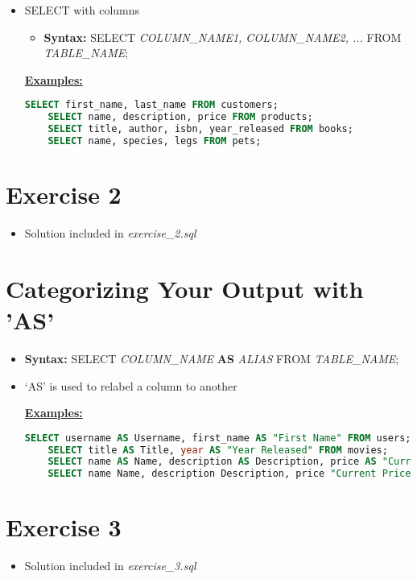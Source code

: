 \documentclass[12pt]{article}
\begin{document}
\bigskip

\begin{itemize}
    \item SELECT with columns
    \begin{itemize}
        \item \textbf{Syntax:} SELECT \textit{COLUMN\_NAME1, COLUMN\_NAME2, ...} FROM \textit{TABLE\_NAME};
    \end{itemize}

    \bigskip

    \underline{\textbf{Examples:}}

    \bigskip

    \begin{lstlisting}[language=SQL]
    SELECT first_name, last_name FROM customers;
    SELECT name, description, price FROM products;
    SELECT title, author, isbn, year_released FROM books;
    SELECT name, species, legs FROM pets;
    \end{lstlisting}
\end{itemize}

\bigskip

\section{Exercise 2}

\bigskip

\begin{itemize}
    \item Solution included in \textit{exercise\_2.sql}
\end{itemize}

\bigskip

\section{Categorizing Your Output with 'AS'}

\bigskip

\begin{itemize}
    \item \textbf{Syntax:} SELECT \textit{COLUMN\_NAME} \textbf{AS} \textit{ALIAS} FROM \textit{TABLE\_NAME};
    \item `AS' is used to relabel a column to another

    \bigskip

    \underline{\textbf{Examples:}}

    \bigskip

    \begin{lstlisting}[language=SQL]
    SELECT username AS Username, first_name AS "First Name" FROM users;
    SELECT title AS Title, year AS "Year Released" FROM movies;
    SELECT name AS Name, description AS Description, price AS "Current Price" FROM products;
    SELECT name Name, description Description, price "Current Price" FROM products;
    \end{lstlisting}
\end{itemize}


\bigskip

\section{Exercise 3}

\bigskip

\begin{itemize}
    \item Solution included in \textit{exercise\_3.sql}
\end{itemize}
\end{document}
